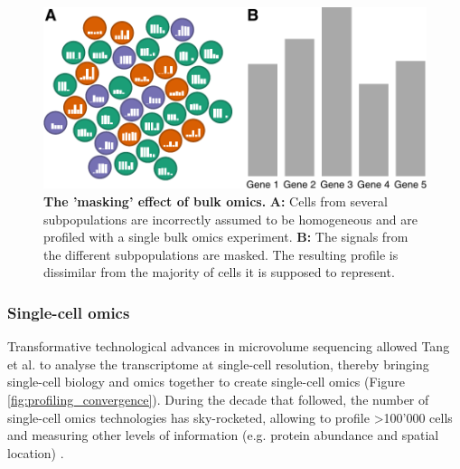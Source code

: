 \begin{figure}[htb!]
	\centering
	\includegraphics[width=\LARgefigure]{fig/bulk_vs_sc} 
	\caption{
		\textbf{The 'masking' effect of bulk omics.} 
		\textbf{A:} Cells from several subpopulations are incorrectly assumed to be homogeneous and are profiled with a single bulk omics experiment.
		\textbf{B:} The signals from the different subpopulations are masked. The resulting profile is dissimilar from the majority of cells it is supposed to represent.
	}
	\label{fig:bulk_vs_sc}
\end{figure}

\subsubsection{Single-cell omics}
Transformative technological advances in microvolume sequencing allowed Tang et al. to analyse the transcriptome at single-cell resolution\cite{tang_mrnaseqwholetranscriptomeanalysis_2009}, thereby bringing single-cell biology and omics together to create single-cell omics (Figure \ref{fig:profiling_convergence}). During the decade that followed, the number of single-cell omics technologies has sky-rocketed, allowing to profile >100'000 cells\cite{svensson_exponentialscalingsinglecell_2018} and measuring other levels of information (e.g. protein abundance and spatial location) \cite{moudgil_multimodalscrnaseq_2019}.

